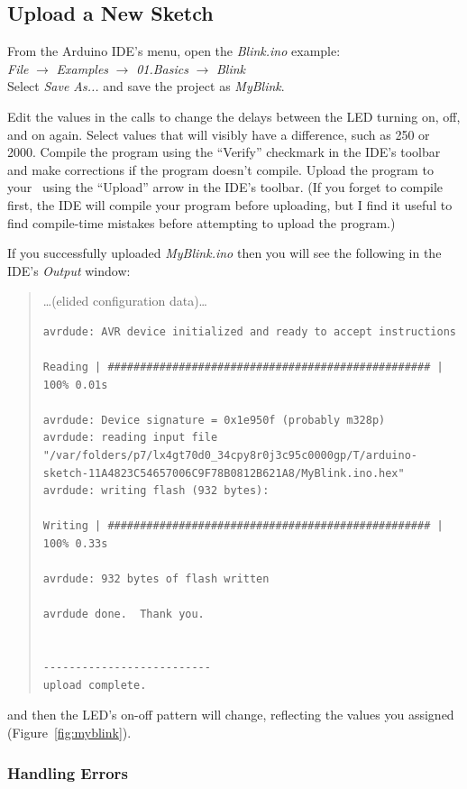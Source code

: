 \subsection{Upload a New Sketch}

From the Arduino IDE's menu, open the \textit{Blink.ino} example: \\
\textit{File} $\rightarrow$ \textit{Examples} $\rightarrow$ \textit{01.Basics} $\rightarrow$ \textit{Blink} \\
Select \textit{Save As...} and save the project as \textit{MyBlink}.

Edit the values in the  calls to change the delays between the
LED turning on, off, and on again. Select values that will visibly have a
difference, such as 250 or 2000. Compile the program using the ``Verify''
checkmark in the IDE's toolbar and make corrections if the program doesn't
compile. Upload the program to your \nano\ using the ``Upload'' arrow in the
IDE's toolbar. (If you forget to compile first, the IDE will compile your
program before uploading, but I find it useful to find compile-time mistakes
before attempting to upload the program.)

If you successfully uploaded \textit{MyBlink.ino} then you will see the
following in the IDE's \textit{Output} window:
\begin{quote}
\dots (elided configuration data)\dots
\begin{verbatim}
avrdude: AVR device initialized and ready to accept instructions

Reading | ################################################## | 100% 0.01s

avrdude: Device signature = 0x1e950f (probably m328p)
avrdude: reading input file "/var/folders/p7/lx4gt70d0_34cpy8r0j3c95c0000gp/T/arduino-sketch-11A4823C54657006C9F78B0812B621A8/MyBlink.ino.hex"
avrdude: writing flash (932 bytes):

Writing | ################################################## | 100% 0.33s

avrdude: 932 bytes of flash written

avrdude done.  Thank you.


--------------------------
upload complete.
\end{verbatim}\end{quote}
and then the LED's on-off pattern will change, reflecting the 
values you assigned (Figure~\ref{fig:myblink}).

\subsubsection*{Handling Errors}

